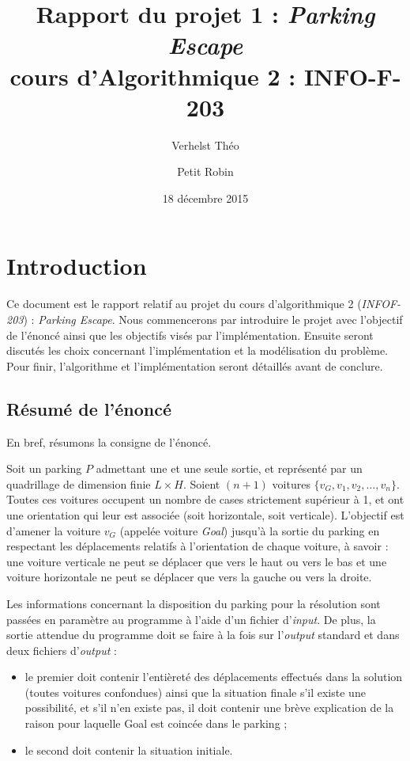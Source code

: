 \documentclass{article}
\title{Rapport du projet 1 : \textit{Parking Escape}\\cours d'Algorithmique 2 : INFO-F-203}
\author{Verhelst Théo \and Petit Robin}
\date{18 décembre 2015}
\begin{document}
\maketitle
\tableofcontents
\newpage
{}

\section{Introduction}
	Ce document est le rapport relatif au projet du cours d'algorithmique 2 (\textit{INFOF-203}) : \textit{Parking Escape}. Nous commencerons par
	introduire le projet avec l'objectif de l'énoncé ainsi que les objectifs visés par l'implémentation. Ensuite seront discutés les choix concernant
	l'implémentation et la modélisation du problème. Pour finir, l'algorithme et l'implémentation seront détaillés avant de conclure.

	\subsection{Résumé de l'énoncé}
		En bref, résumons la consigne de l'énoncé.

		Soit un parking $P$ admettant une et une seule sortie, et représenté par un quadrillage de dimension finie $L\times H$. Soient $(n+1)$ voitures
		$\{v_G, v_1, v_2, \ldots, v_n\}$. Toutes ces voitures occupent un nombre de cases strictement supérieur à 1, et ont une
		orientation qui leur est associée (soit horizontale, soit verticale). L'objectif est d'amener la voiture $v_G$ (appelée voiture \textit{Goal})
		jusqu'à la sortie du parking en respectant les déplacements relatifs à l'orientation de chaque voiture, à savoir : une voiture verticale ne peut
		se déplacer que vers le haut ou vers le bas et une voiture horizontale ne peut se déplacer que vers la gauche ou vers la droite.

		Les informations concernant la disposition du parking pour la résolution sont passées en paramètre au programme à l'aide d'un fichier d'\textit{input}.
		De plus, la sortie attendue du programme doit se faire à la fois sur l'\textit{output} standard et dans deux fichiers d'\textit{output} :

		\begin{itemize}
			\item le premier doit contenir l'entièreté des déplacements effectués dans la solution (toutes voitures confondues)
				  ainsi que la situation finale s'il existe une possibilité, et s'il n'en existe pas, il doit contenir une brève
				  explication de la raison pour laquelle Goal est coincée dans le parking ;
			\item le second doit contenir la situation initiale.
		\end{itemize}
\end{document}
